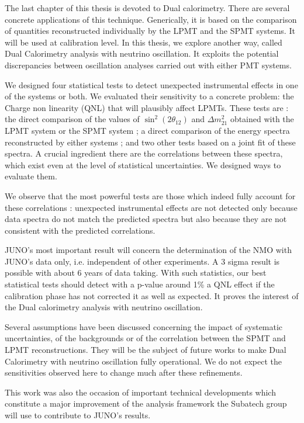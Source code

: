 \documentclass[../main.tex]{subfiles}
\begin{document}
The last chapter of this thesis is devoted to Dual calorimetry. There are several concrete applications of this technique. Generically, it is based on the comparison of quantities reconstructed individually by the LPMT and the SPMT systems. It will be used at calibration level. In this thesis, we explore another way, called Dual Calorimetry analysis with neutrino oscillation. It exploits the potential discrepancies between oscillation analyses carried out with either PMT systems.

We designed four statistical tests to detect unexpected instrumental effects in one of the systems or both. We evaluated their sensitivity to a concrete problem: the Charge non linearity (QNL) that will plausibly affect LPMTs. These tests are : the direct comparison of the values of $\sin^2(2 \theta_{12})$ and $\Delta m^2_{21}$ obtained with the LPMT system or the SPMT system ; a direct comparison of the energy spectra reconstructed by either systems ; and two other tests based on a joint fit of these spectra. A crucial ingredient there are the correlations between these spectra, which exist even at the level of statistical uncertainties. We designed ways to evaluate them.

We observe that the most powerful tests are those which indeed fully account for these correlations : unexpected instrumental effects are not detected only because data spectra do not match the predicted spectra but also because they are not consistent with the predicted correlations.

JUNO's most important result will concern the determination of the NMO with JUNO's data only, i.e. independent of other experiments. A 3 sigma result is possible with about 6 years of data taking. With such statistics, our best statistical tests should detect with a p-value around 1\% a QNL effect if the calibration phase has not corrected it as well as expected. It proves the interest of the Dual calorimetry analysis with neutrino oscillation.

Several assumptions have been discussed concerning the impact of systematic uncertainties, of the backgrounds or of the correlation between the SPMT and LPMT reconstructions. They will be the subject of future works to make Dual Calorimetry with neutrino oscillation fully operational. We do not expect the sensitivities observed here to change much after these refinements.

This work was also the occasion of important technical developments which constitute a major improvement of the analysis framework the Subatech group will use to contribute to JUNO's results.
\end{document}

